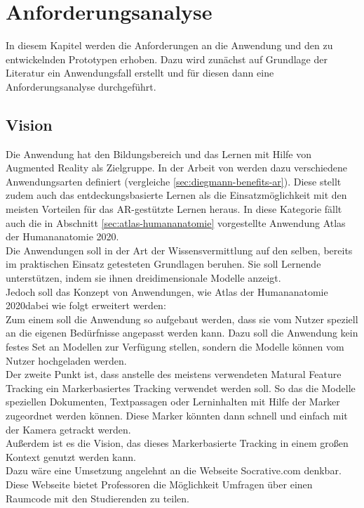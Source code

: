 \chapter{Anforderungsanalyse}\label{chapter:anforderungsanalyse}
In diesem Kapitel werden die Anforderungen an die Anwendung und den zu entwickelnden Prototypen erhoben. Dazu wird zunächst auf Grundlage der Literatur ein Anwendungsfall erstellt und für diesen dann eine Anforderungsanalyse durchgeführt.


\section{Vision}
Die Anwendung hat den Bildungsbereich und das Lernen mit Hilfe von Augmented Reality als Zielgruppe. In der Arbeit von \citeauthor{diegmann:benefits-ar} werden dazu verschiedene Anwendungsarten definiert (vergleiche \ref{sec:diegmann-benefits-ar}). Diese stellt zudem auch das entdeckungsbasierte Lernen als die Einsatzmöglichkeit mit den meisten Vorteilen für das AR-gestützte Lernen heraus. In diese Kategorie fällt auch die in Abschnitt \ref{sec:atlas-humananatomie} vorgestellte Anwendung \glqq Atlas der Humananatomie 2020\grqq. \\
Die Anwendungen soll in der Art der Wissensvermittlung auf den selben, bereits im praktischen Einsatz getesteten Grundlagen beruhen. Sie soll Lernende unterstützen, indem sie ihnen dreidimensionale Modelle anzeigt. \\
Jedoch soll das Konzept von Anwendungen, wie \glqq Atlas der Humananatomie 2020\grqq dabei wie folgt erweitert werden:\\
Zum einem soll die Anwendung so aufgebaut werden, dass sie vom Nutzer speziell an die eigenen Bedürfnisse angepasst werden kann. Dazu soll die Anwendung kein festes Set an Modellen zur Verfügung stellen, sondern die Modelle können vom Nutzer hochgeladen werden. \\
Der zweite Punkt ist, dass anstelle des meistens verwendeten Matural Feature Tracking ein Markerbasiertes Tracking verwendet werden soll. So das die Modelle speziellen Dokumenten, Textpassagen oder Lerninhalten mit Hilfe der Marker zugeordnet werden können. Diese Marker könnten dann schnell und einfach mit der Kamera getrackt werden.\\
Außerdem ist es die Vision, das dieses Markerbasierte Tracking in einem großen Kontext genutzt werden kann. \\
Dazu wäre eine Umsetzung angelehnt an die Webseite Socrative.com denkbar. Diese Webseite bietet Professoren die Möglichkeit Umfragen über einen Raumcode mit den Studierenden zu teilen. \\
